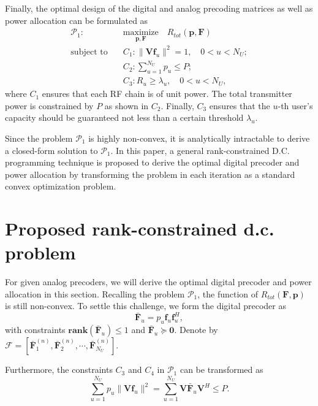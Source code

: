 \documentclass[10pt,journal,twocolumn,twoside]{IEEEtran}
\begin{document}
Finally, the optimal design of the digital and analog precoding matrices as well as power allocation can be formulated as
\begin{align}\label{eq:maxsumrate}
\mathcal{P}_1: \quad&\underset{\bm{p},\bm{F}}{\text{maximize}}\quad R_{tot}(\bm{p}, \bm{F})\\
\text{subject to} \quad %
&C_1: \|\bm{V} \bm{f}_u\|^2 = 1, \quad 0<u<N_U;\nonumber\\
&C_2: \sum_{u=1}^{N_U}p_{u} \leq P;\nonumber\\
&C_3: R_{u}\geq \lambda_{u}, \quad 0<u<N_U, \nonumber
\end{align}
where $C_1$ ensures that each RF chain is of unit power. The total transmitter power is constrained by $P$ as shown in $C_2$. Finally, $C_3$ ensures that the $u$-th user's capacity should be guaranteed not less than a certain threshold $\lambda_{u}$.

Since the problem $\mathcal{P}_1$ is highly non-convex, it is analytically intractable to derive a closed-form solution to $\mathcal{P}_1$. In this paper, a general rank-constrained D.C. programming technique is proposed to derive the optimal digital precoder and power allocation by transforming the problem in each iteration as a standard convex optimization problem.

\section{Proposed rank-constrained d.c. problem}\label{analogAndDigital}

For given analog precoders, we will derive the optimal digital precoder and power allocation in this section. Recalling the problem $\mathcal{P}_1$, the function of $R_{tot}(\bm{F}, \bm{p})$ is still non-convex.  To settle this challenge, we form the digital precoder as
\begin{equation}
\bar{\bm{F}}_{u} = p_u\bm{f}_{u} \bm{f}_{u}^H,
\end{equation}
with constraints $\textbf{rank}(\bar{\bm{F}}_{u})\leq 1$ and $\bar{\bm{F}}_{u} \succeq \bm{0}$. Denote by $\bm{\mathcal{F}} = [\bar{\bm{F}}^{(n)}_1, \bar{\bm{F}}^{(n)}_2,\cdots, \bar{\bm{F}}^{(n)}_{N_U}]$.

 Furthermore, the constraints $C_3$ and $C_4$ in $\mathcal{P}_1$ can be transformed as
\begin{equation}
 \sum_{u=1}^{N_U} p_u\|\bm{V} \bm{f}_{u}\|^2 = \sum_{u=1}^{N_U}\bm{V} \bar{\bm{F}}_u\bm{V} ^H \leq P.
\end{equation}
\end{document}
